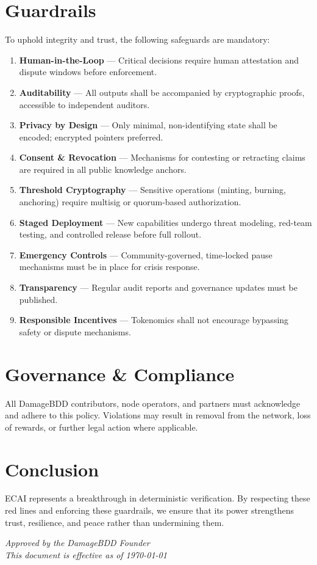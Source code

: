 \documentclass[12pt,a4paper]{article}
\begin{document}
\section*{Guardrails}
To uphold integrity and trust, the following safeguards are mandatory:
\begin{enumerate}[label=\textbf{\arabic*.}]
  \item \textbf{Human-in-the-Loop} — Critical decisions require human attestation and dispute windows before enforcement.
  \item \textbf{Auditability} — All outputs shall be accompanied by cryptographic proofs, accessible to independent auditors.
  \item \textbf{Privacy by Design} — Only minimal, non-identifying state shall be encoded; encrypted pointers preferred.
  \item \textbf{Consent \& Revocation} — Mechanisms for contesting or retracting claims are required in all public knowledge anchors.
  \item \textbf{Threshold Cryptography} — Sensitive operations (minting, burning, anchoring) require multisig or quorum-based authorization.
  \item \textbf{Staged Deployment} — New capabilities undergo threat modeling, red-team testing, and controlled release before full rollout.
  \item \textbf{Emergency Controls} — Community-governed, time-locked pause mechanisms must be in place for crisis response.
  \item \textbf{Transparency} — Regular audit reports and governance updates must be published.
  \item \textbf{Responsible Incentives} — Tokenomics shall not encourage bypassing safety or dispute mechanisms.
\end{enumerate}

\section*{Governance \& Compliance}
All DamageBDD contributors, node operators, and partners must acknowledge and adhere to this policy. 
Violations may result in removal from the network, loss of rewards, or further legal action where applicable.

\section*{Conclusion}
ECAI represents a breakthrough in deterministic verification. 
By respecting these red lines and enforcing these guardrails, 
we ensure that its power strengthens trust, resilience, and peace rather than undermining them.

\vfill
\begin{center}
\textit{Approved by the DamageBDD Founder \\
This document is effective as of \today}
\end{center}
\end{document}

